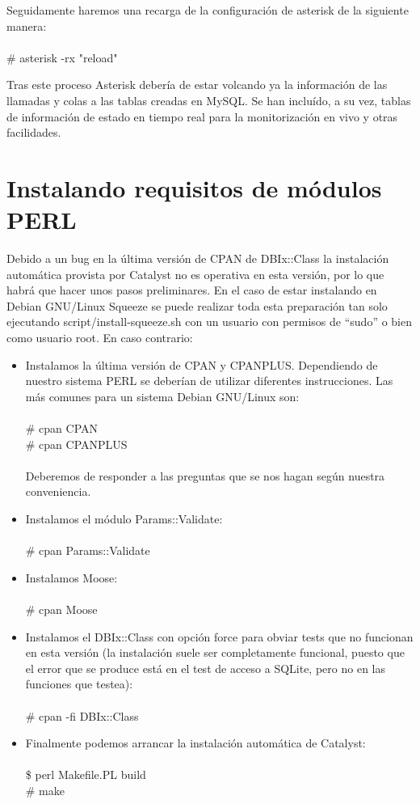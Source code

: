 \documentclass[spanish,12pt]{book}
\begin{document}
Seguidamente haremos una recarga de la configuración de asterisk de la siguiente manera:\\\\\# asterisk -rx "reload"

Tras este proceso Asterisk debería de estar volcando ya la información de las llamadas y colas a las tablas creadas en MySQL. Se han incluído, a su vez, tablas de información de estado en tiempo real para la monitorización en vivo y otras facilidades.

\section{Instalando requisitos de módulos PERL}
Debido a un bug en la última versión de CPAN de DBIx::Class la instalación automática provista por Catalyst no es operativa en esta versión, por lo que habrá que hacer unos pasos preliminares. En el caso de estar instalando en Debian GNU/Linux Squeeze se puede realizar toda esta preparación tan solo ejecutando script/install-squeeze.sh con un usuario con permisos de ``sudo'' o bien como usuario root. En caso contrario:
\begin{itemize}
\item Instalamos la última versión de CPAN y CPANPLUS. Dependiendo de nuestro sistema PERL se deberían de utilizar diferentes instrucciones. Las más comunes para un sistema Debian GNU/Linux son:\\\\\# cpan CPAN\\\# cpan CPANPLUS\\\\Deberemos de responder a las preguntas que se nos hagan según nuestra conveniencia.
\item Instalamos el módulo Params::Validate:\\\\\# cpan Params::Validate
\item Instalamos Moose:\\\\\# cpan Moose
\item Instalamos el DBIx::Class con opción \-\-force para obviar tests que no funcionan en esta versión (la instalación suele ser completamente funcional, puesto que el error que se produce está en el test de acceso a SQLite, pero no en las funciones que testea):\\\\\# cpan -fi DBIx::Class
\item Finalmente podemos arrancar la instalación automática de Catalyst:\\\\\$ perl Makefile.PL build\\\# make
\end{itemize}
\end{document}
